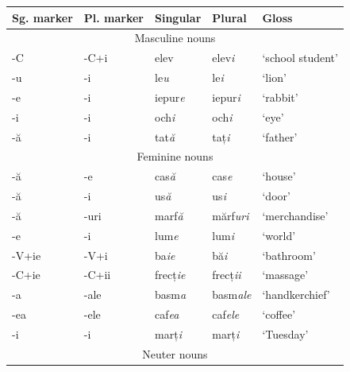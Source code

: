\begin{table}[!htbp]
  \centering
  \begin{tabular}{lllll}
    \lsptoprule
    Sg. marker & Pl. marker & Singular           & Plural             & Gloss            \\
        \midrule
    \multicolumn{5}{c}{Masculine nouns}                                                  \\
    \midrule
    -C         & -C+i       & elev      & elev\textit{i}     & `school student' \\
    -u         & -i         & le\textit{u}       & le\textit{i}       & `lion'           \\
    -e         & -i         & iepur\textit{e}    & iepur\textit{i}    & `rabbit'         \\
    -i         & -i         & och\textit{i}      & och\textit{i}      & `eye'            \\
    -ă         & -i         & tat\textit{ă}      & taț\textit{i}      & `father'         \\
    \midrule
    \multicolumn{5}{c}{Feminine nouns}                                                   \\
    \midrule
    -ă         & -e         & cas\textit{ă}      & cas\textit{e}      & `house'          \\
    -ă         & -i         & us\textit{ă}       & us\textit{i}       & `door'           \\
    -ă         & -uri       & marf\textit{ă}     & mărf\textit{uri}   & `merchandise'    \\
    -e         & -i         & lum\textit{e}      & lum\textit{i}      & `world'          \\
    -V+ie      & -V+i       & ba\textit{ie}      & bă\textit{i}       & `bathroom'       \\
    -C+ie      & -C+ii      & frecț\textit{ie}   & frecț\textit{ii}   & `massage'        \\
    -a         & -ale       & basm\textit{a}     & basm\textit{ale}   & `handkerchief'   \\
    -ea        & -ele       & caf\textit{ea}     & caf\textit{ele}    & `coffee'         \\
    -i         & -i         & marț\textit{i}     & marț\textit{i}     & `Tuesday'        \\
    \midrule
    \multicolumn{5}{c}{Neuter nouns}                                                     \\
    \midrule

\end{tabular}
\end{table}
